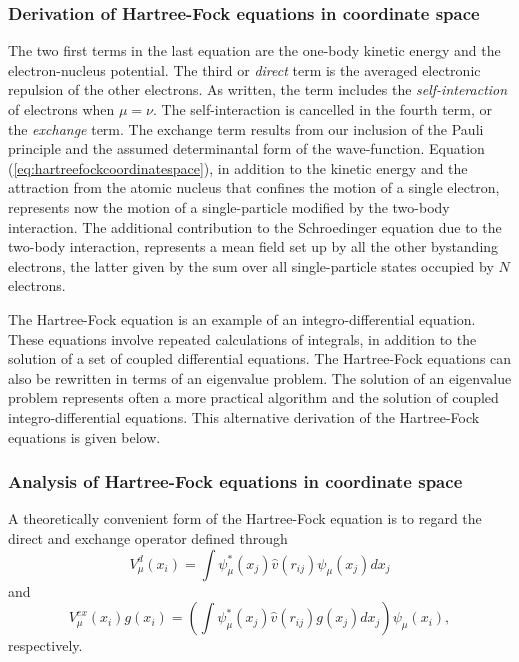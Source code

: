 \documentclass{beamer}
\begin{document}
\begin{frame}
\frametitle{Derivation of Hartree-Fock equations in coordinate space}

\begin{block}{}
The two first terms in the last equation are the one-body kinetic energy and the
electron-nucleus potential. The third or \emph{direct} term is the averaged electronic repulsion of the other
electrons. As written, the
term includes the \emph{self-interaction} of 
electrons when $\mu=\nu$. The self-interaction is cancelled in the fourth
term, or the \emph{exchange} term. The exchange term results from our
inclusion of the Pauli principle and the assumed determinantal form of
the wave-function. Equation (\ref{eq:hartreefockcoordinatespace}), in addition to the kinetic energy and the attraction from the atomic nucleus that confines the motion of a single electron,   represents now the motion of a single-particle modified by the two-body interaction. The additional contribution to the Schroedinger equation due to the two-body interaction, represents a mean field set up by all the other bystanding electrons, the latter given by the sum over all single-particle states occupied by $N$ electrons. 

The Hartree-Fock equation is an example of an integro-differential equation. These equations involve repeated calculations of integrals, in addition to the solution of a set of coupled differential equations. 
The Hartree-Fock equations can also be rewritten in terms of an eigenvalue problem. The solution of an eigenvalue problem represents often a more practical algorithm and the  solution of  coupled  integro-differential equations.
This alternative derivation of the Hartree-Fock equations is given below.
\end{block}
\end{frame}

\begin{frame}
\frametitle{Analysis of Hartree-Fock equations in coordinate space}

\begin{block}{}
  A theoretically convenient form of the
Hartree-Fock equation is to regard the direct and exchange operator
defined through 
\begin{equation*}
  V_{\mu}^{d}(x_i) = \int \psi_{\mu}^*(x_j) 
 \hat{v}(r_{ij})\psi_{\mu}(x_j) dx_j
\end{equation*}
and
\begin{equation*}
  V_{\mu}^{ex}(x_i) g(x_i) 
  = \left(\int \psi_{\mu}^*(x_j) 
 \hat{v}(r_{ij})g(x_j) dx_j
  \right)\psi_{\mu}(x_i),
\end{equation*}
respectively. 
\end{block}
\end{frame}
\end{document}
